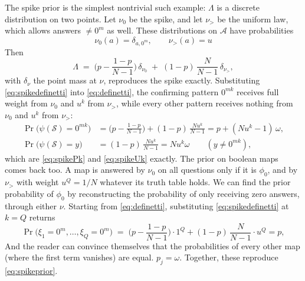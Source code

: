 \documentclass[11pt]{article}
\begin{document}
The spike prior is the simplest nontrivial such example: $\Lambda$ is a discrete
distribution on two points. Let $\nu_0$ be the spike,
and let $\nu_{>}$ be the uniform law, which allows answers $\neq 0^m$ as
well. These distributions on $\mathcal A$ have probabilities
\begin{equation}
  \nu_0(a) = \delta_{a,0^m},\quad\quad
  \nu_>(a) = u
\end{equation}
Then
%
\begin{equation}
  \Lambda \;=\;
  \Big(p - \frac{1-p}{N-1}\Big)\, \delta_{\nu_0}
  \;+\;
  (1-p)\,\frac{N}{N-1}\, \delta_{\nu_{>}},
  \label{eq:spikedefinetti}
\end{equation}
%
with $\delta_\nu$ the point mass at $\nu$, reproduces the spike
exactly. Substituting \eqref{eq:spikedefinetti} into
\eqref{eq:definetti}, the confirming pattern $0^{mk}$ receives full
weight from $\nu_0$ and $u^k$ from $\nu_{>}$, while every other
pattern receives nothing from $\nu_0$ and $u^k$ from $\nu_{>}$:
%
\begin{equation}
\begin{aligned}
  \Pr\big(\psi(\mathcal S) = 0^{mk}\big)
  &= \Big(p - \frac{1-p}{N-1}\Big) + (1-p)\,\frac{N u^k}{N-1}
  = p + (Nu^k - 1)\,\omega , \\[2pt]
  \Pr\big(\psi(\mathcal S) = y\big)
  &= (1-p)\,\frac{N u^k}{N-1} = N u^k \omega
  \qquad (y \neq 0^{mk}),
\end{aligned}
  \label{eq:spikedefinettitwo}
\end{equation}
%
which are \eqref{eq:spikePk} and \eqref{eq:spikeUk} exactly. The
prior on boolean maps comes back too. A map is answered by $\nu_0$ on all questions 
only if it is $\phi_0$, and by $\nu_{>}$ with weight $u^Q = 1/N$ whatever its
truth table holds. We can find the prior probability of $\phi_0$ by reconstructing the probability
of only receiving zero answers, through either $\nu$. Starting from \eqref{eq:definetti}, substituting \eqref{eq:spikedefinetti} at $k = Q$ returns
\begin{equation}
  \Pr\big(\xi_1 = 0^m, \ldots, \xi_Q = 0^m\big)
  \;=\; \Big(p - \frac{1-p}{N-1}\Big) \cdot 1^Q + (1-p)\,\frac{N}{N-1} \cdot u^Q = p,
  \label{eq:definettispecif}
\end{equation}
And the reader can convince themselves that the probabilities of every other map (where the first term vanishes) are equal.
$p_j = \omega$. Together, these reproduce \eqref{eq:spikeprior}. 
\end{document}

